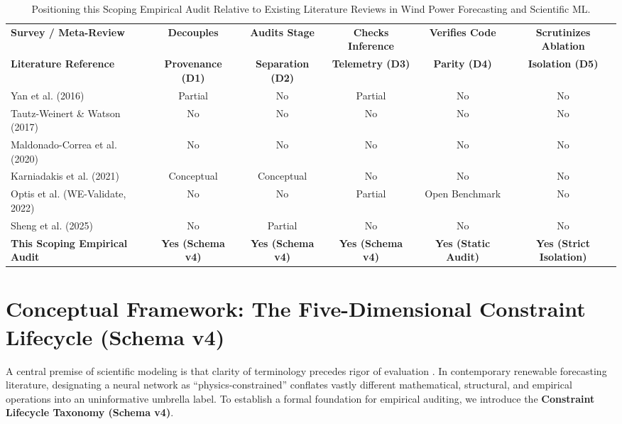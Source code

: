 \documentclass[preprint,3p,times]{elsarticle}
\begin{document}
\begin{table}[t]
\centering
\small
\caption{Positioning this Scoping Empirical Audit Relative to Existing Literature Reviews in Wind Power Forecasting and Scientific ML.}
\label{tab:lit_comparison}
\begin{tabular}{p{4.2cm}ccccc}
\toprule
\textbf{Survey / Meta-Review} & \textbf{Decouples} & \textbf{Audits Stage} & \textbf{Checks Inference} & \textbf{Verifies Code} & \textbf{Scrutinizes Ablation} \\
\textbf{Literature Reference} & \textbf{Provenance (D1)} & \textbf{Separation (D2)} & \textbf{Telemetry (D3)} & \textbf{Parity (D4)} & \textbf{Isolation (D5)} \\
\midrule
Yan et al. (2016) \cite{yan2016review} & Partial & No & Partial & No & No \\
Tautz-Weinert \& Watson (2017) \cite{tautzweinert2017review} & No & No & No & No & No \\
Maldonado-Correa et al. (2020) \cite{maldonadocorrea2020slr} & No & No & No & No & No \\
Karniadakis et al. (2021) \cite{karniadakis2021physics} & Conceptual & Conceptual & No & No & No \\
Optis et al. (WE-Validate, 2022) \cite{optis2022} & No & No & Partial & Open Benchmark & No \\
Sheng et al. (2025) \cite{sheng2025annreview} & No & Partial & No & No & No \\
\midrule
\textbf{This Scoping Empirical Audit} & \textbf{Yes (Schema v4)} & \textbf{Yes (Schema v4)} & \textbf{Yes (Schema v4)} & \textbf{Yes (Static Audit)} & \textbf{Yes (Strict Isolation)} \\
\bottomrule
\end{tabular}
\end{table}

\section{Conceptual Framework: The Five-Dimensional Constraint Lifecycle (Schema v4)}
\label{sec:framework}

A central premise of scientific modeling is that clarity of terminology precedes rigor of evaluation \cite{lipton2019}. In contemporary renewable forecasting literature, designating a neural network as ``physics-constrained'' conflates vastly different mathematical, structural, and empirical operations into an uninformative umbrella label. To establish a formal foundation for empirical auditing, we introduce the \textbf{Constraint Lifecycle Taxonomy (Schema v4)}.
\end{document}
